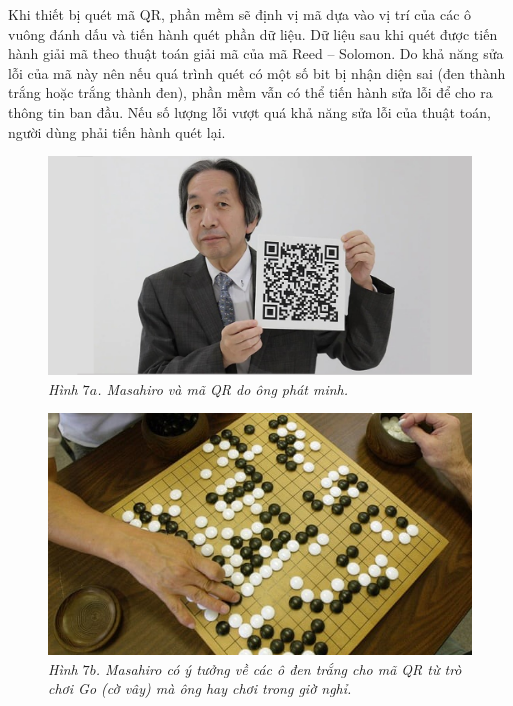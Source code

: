 \begin{multicols}{2}
	Khi thiết bị quét mã QR, phần mềm sẽ định vị mã dựa vào vị trí của các ô vuông đánh dấu và tiến hành quét phần dữ liệu. Dữ liệu sau khi quét được tiến hành giải mã theo thuật toán giải mã của mã Reed -- Solomon. Do khả năng sửa lỗi của mã này nên nếu quá trình quét có một số bit bị nhận diện sai (đen thành trắng hoặc trắng thành đen), phần mềm vẫn có thể tiến hành sửa lỗi để cho ra thông tin ban đầu. Nếu số lượng lỗi vượt quá khả năng sửa lỗi của thuật toán, người dùng phải tiến hành quét lại.
	\begin{figure}[H]
		\vspace*{-5pt}
		\centering
		\captionsetup{labelformat= empty, justification=centering}
		\includegraphics[width= 1\linewidth]{14}
		\caption{\small\textit{\color{toanhocdoisong}Hình $7a$. Masahiro và mã QR do ông phát minh.}}
		\vspace*{-5pt}
	\end{figure}
	\begin{figure}[H]
		\vspace*{5pt}
		\centering
		\captionsetup{labelformat= empty, justification=centering}
		\includegraphics[width= 1\linewidth]{15}
		\caption{\small\textit{\color{toanhocdoisong}Hình $7b$. Masahiro có ý tưởng về các ô đen trắng cho mã QR từ trò chơi Go (cờ vây) mà ông hay chơi trong giờ nghỉ.}}

\end{figure}
\end{multicols}
